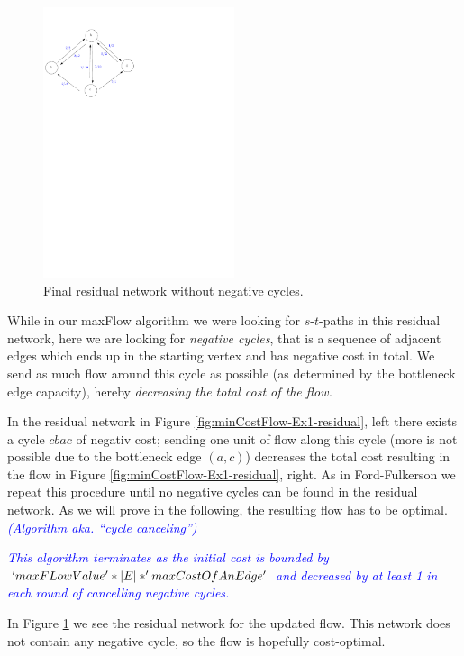 \documentclass{article}
\begin{document}
\begin{figure}
\includegraphics[width=0.5\textwidth]{Figs/minCostFlow-Ex1-residual2}
\caption{Final residual network without negative cycles.}\label{fig:minCostFlow-Ex1-residual2}
\end{figure}
While in our maxFlow algorithm we were looking for $s$-$t$-paths in this residual network, here we are looking for \emph{negative cycles}, that is a sequence of adjacent edges which ends up in the starting vertex and has negative cost in total. We send as much flow around this cycle as possible (as determined by the bottleneck edge capacity), hereby \emph{decreasing the total cost of the flow.}

In the residual network in Figure \ref{fig:minCostFlow-Ex1-residual}, left there exists a cycle $cbac$ of negativ cost; sending one unit of flow along this cycle (more is not possible due to the bottleneck edge $(a,c)$) decreases the total cost resulting in the flow in Figure \ref{fig:minCostFlow-Ex1-residual}, right.
As in Ford-Fulkerson we repeat this procedure until no negative cycles can be found in the residual network. As we will prove in the following, the resulting flow has to be optimal. \textcolor{blue}{\emph{(Algorithm aka. "`cycle canceling"')}}

\textcolor{blue}{\emph{This algorithm terminates as the initial cost is bounded by $`maxFLowValue' * |E| * 'maxCostOfAnEdge'$ and decreased by at least 1 in each round of cancelling negative cycles.}}

In Figure \ref{fig:minCostFlow-Ex1-residual2} we see the residual network for the updated flow. This network does not contain any negative cycle, so the flow is hopefully cost-optimal.
\end{document}
